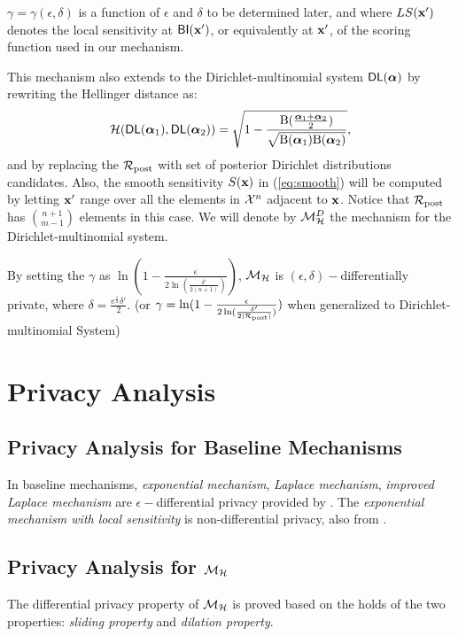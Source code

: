 \documentclass{article}
\begin{document}
$\gamma = \gamma(\epsilon, \delta)$ is a function of $\epsilon$ and $\delta$ to
be determined later, and where $LS(\textbf{x}')$ denotes the local
sensitivity at $\mathsf{BI}(\textbf{x}')$, or equivalently at $\textbf{x}'$,
of the scoring function used in our mechanism.

This mechanism also extends to the Dirichlet-multinomial system $\mathsf{DL}(\boldsymbol{\alpha})$ by rewriting the Hellinger distance as:
\[
  \mathcal{H}(\mathsf{DL}(\boldsymbol{\alpha}_1), \mathsf{DL}(\boldsymbol{\alpha}_2)) = \sqrt{1 - \frac{\textup{B}(\frac{\boldsymbol{\alpha}_1 + \boldsymbol{\alpha}_2}{2})}{\sqrt{\textup{B}(\boldsymbol{\alpha}_1) \textup{B}(\boldsymbol{\alpha}_2)}}},
\]
and by replacing the $\mathcal{R}_{\textup{post}}$ with set of posterior Dirichlet
distributions candidates. Also, the smooth sensitivity $S(\textbf{x})$
in (\ref{eq:smooth}) will be computed by letting $\textbf{x}'$ range
over all the elements in $\mathcal{X}^{n}$ adjacent to $\textbf{x}$. Notice
that $\mathcal{R}_{\textup{post}}$ has $\binom{n + 1}{m - 1}$ elements in this case. We
will denote by $\mathcal{M}^{D}_{\mathcal{H}}$ the mechanism for the
Dirichlet-multinomial system.

By setting the $\gamma$ as $\ln(1 - \frac{\epsilon}{2 \ln (\frac{\delta'}{2 (n + 1)})})$, $\mathcal{M}_{\mathcal{H}}$ is $(\epsilon, \delta) -$differentially private, where $\delta = \frac{e^{\frac{\epsilon}{2}} \delta'}{2}$. (or $\gamma = \ln(1 - \frac{\epsilon}{2 \ln (\frac{\delta'}{2 |\mathcal{R}_{\textup{post}}|})})$ when generalized to Dirichlet-multinomial System)


\section{Privacy Analysis}

\subsection{Privacy Analysis for Baseline Mechanisms}
In baseline mechanisms, \emph{exponential mechanism}, \emph{Laplace mechanism}, \emph{improved Laplace mechanism} are $\epsilon-$differential privacy provided by \cite{dwork2014algorithmic}. The \emph{exponential mechanism with local sensitivity} is non-differential privacy, also from \cite{dwork2014algorithmic}.

\subsection{Privacy Analysis for $\mathcal{M}_{\mathcal{H}}$}

The differential privacy property of $\mathcal{M}_{\mathcal{H}}$ is proved based on the holds of the two properties: \emph{sliding property} and \emph{dilation property}.\\
\end{document}

